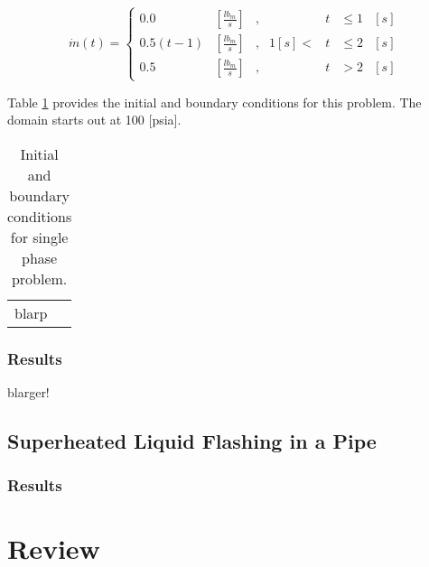 \begin{equation}
\label{eqn:bc_time_func_single}
\dot{m}(t) = \left\{
\begin{array}{cclrcll}
 0.0           & [\frac{lb_m}{s}] & , &         & t & \leq 1 &[s] \\
 0.5 ( t - 1)  & [\frac{lb_m}{s}] & , & 1 [s] < & t & \leq 2 &[s] \\
 0.5           & [\frac{lb_m}{s}] & , &         & t & > 2    &[s]
\end{array}\right.
\end{equation}

Table \ref{tab:ic_single} provides the initial and boundary conditions for this problem.
The domain starts out at 100 [psia].

\begin{table}[h!t]
\centering
\begin{tabular}{|l|}
blarp
\end{tabular}
\caption{Initial and boundary conditions for single phase problem.}
\label{tab:ic_single}
\end{table}

\subsubsection{Results}
\label{subsubsect:single_results}
blarger!


\subsection{Superheated Liquid Flashing in a Pipe}
\label{subsect:flashing_numerical_experiment}

\subsubsection{Results}
\label{subsubsect:flashing_results}


\section{Review}
\label{sect:scaling_review}
